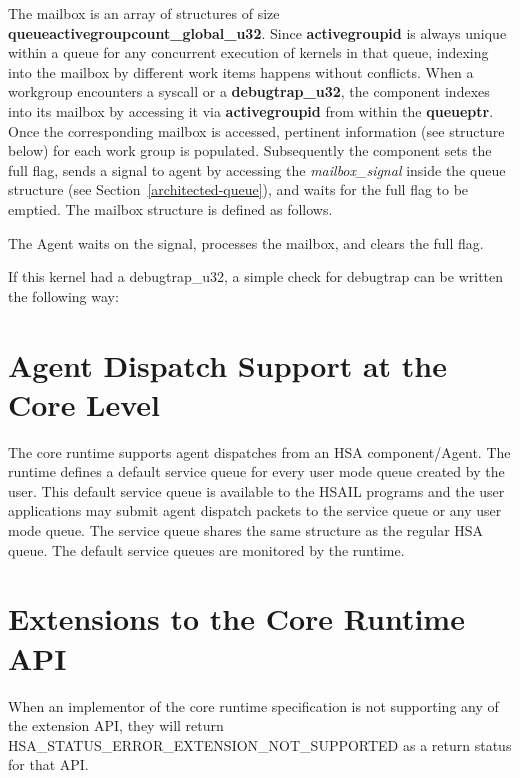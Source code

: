 \documentclass[draft]{book}
\newcommand{\reffun}[1]{\textbf{#1}}
\newcommand{\reffld}[1]{\textit{#1}}
\newcommand{\reftyp}[1]{#1}
\newcommand{\refenu}[1]{\reftyp{#1}}
\newcommand{\refhsl}[1]{\reffun{#1}}
\begin{document}
The mailbox is an array of structures of size
\refhsl{queueactivegroupcount_global_u32}. Since \refhsl{activegroupid} is always
unique within a queue for any concurrent execution of kernels in that queue,
indexing into the mailbox by different work items happens without
conflicts. When a workgroup encounters a syscall or a \refhsl{debugtrap_u32}, the
component indexes into its mailbox by accessing it via \refhsl{activegroupid} from
within the \refhsl{queueptr}. Once the corresponding mailbox is accessed,
pertinent information (see structure below) for each work group is populated.
Subsequently the component sets the full flag, sends a signal to agent by
accessing the \reffld{mailbox_signal} inside the queue structure (see
Section~\ref{architected-queue}), and waits for the full flag to be emptied. The
mailbox structure is defined as follows.



The Agent waits on the signal, processes the mailbox, and clears the full flag.

If this kernel had a debugtrap_u32, a simple check for debugtrap can be
written the following way:



\hypertarget{agent}{}\section{Agent Dispatch Support at the Core Level}\label{agent}

The core runtime supports agent dispatches from an HSA component/Agent. The
runtime defines a default service queue for every user mode queue created by the
user. This default service queue is available to the HSAIL programs and the user
applications may submit agent dispatch packets to the service queue or any user
mode queue. The service queue shares the same structure as the regular HSA
queue. The default service queues are monitored by the
runtime. 


\hypertarget{extensions}{}\section{Extensions to the Core Runtime
  API}\label{extensions}

When an implementor of the core runtime specification is not supporting any of
the extension API, they will return
\refenu{HSA_STATUS_ERROR_EXTENSION_NOT_SUPPORTED} as a return status for
that API.
\end{document}
